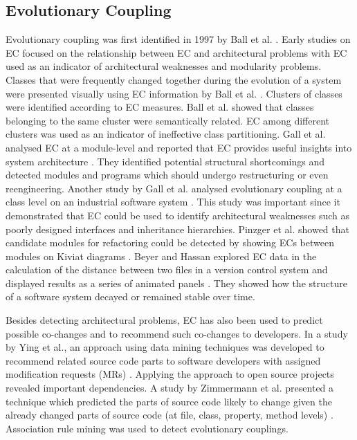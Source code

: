 \documentclass[times]{smrauth}
\begin{document}
\subsection{Evolutionary Coupling}

Evolutionary coupling was first identified in 1997 by Ball et al. \cite{ball1997if}. Early studies on EC focused on the relationship between EC and architectural problems with EC used as an indicator of architectural weaknesses and modularity problems. Classes that were frequently changed together during the evolution of a system were presented visually using EC information by Ball et al. \cite{ball1997if}. Clusters of classes were identified according to EC measures. Ball et al. showed that classes belonging to the same cluster were semantically related. EC among different clusters was used as an indicator of ineffective class partitioning. Gall et al. analysed EC at a module-level and reported that EC provides useful insights into system architecture \cite{gall1998detection}. They identified potential structural shortcomings and detected modules and programs which should undergo restructuring or even reengineering. Another study by Gall et al. analysed  evolutionary coupling at a class level on an industrial software system \cite{gall2003cvs}. This study was important since it demonstrated that EC could be used to identify architectural weaknesses such as poorly designed interfaces and inheritance hierarchies. Pinzger et al. showed that candidate modules for refactoring could be detected by showing ECs between modules on Kiviat diagrams \cite{pinzger2005visualizing}. Beyer and Hassan explored EC data in the calculation of the distance between two files in a version control system and displayed results as a series of animated panels \cite{beyer2006animated}. They showed how the structure of a software system decayed or remained stable over time.

Besides detecting architectural problems, EC has also been used to predict possible co-changes and to recommend such co-changes to developers. In a study by Ying et al., an approach using data mining techniques was developed to recommend related source code parts to software developers with assigned modification requests (MRs) \cite{ying2004predicting}. Applying the approach to open source projects revealed important dependencies. A study by Zimmermann et al. presented a technique which predicted the parts of source code likely to change given the already changed parts of source code (at file, class, property, method levels) \cite{zimmermann2005mining}. Association rule mining was used to detect evolutionary couplings. 
\end{document}

